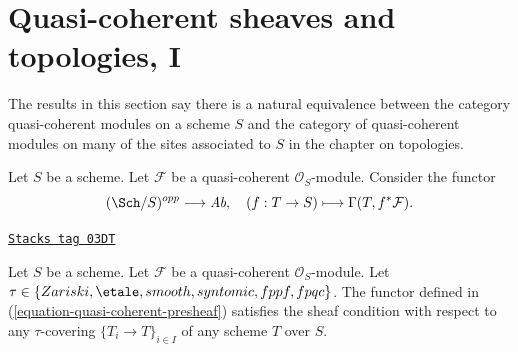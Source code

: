 \section{Quasi-coherent sheaves and topologies, I}
\label{descent-section-quasi-coherent-sheaves}
The results in this section say there is a natural equivalence between
the category quasi-coherent modules on a scheme $S$ and the category
of quasi-coherent modules on many of the sites associated to $S$
in the chapter on topologies.

\medskip\noindent
Let $S$ be a scheme.
Let $\mathcal{F}$ be a quasi-coherent $\mathcal{O}_S$-module.
Consider the functor
\begin{equation}
\label{equation-quasi-coherent-presheaf}
(\Sch/S)^{opp} \longrightarrow \textit{Ab},
\quad
(f : T \to S) \longmapsto \Gamma(T, f^*\mathcal{F}).
\end{equation}

\begin{lemma}
\label{descent-lemma-sheaf-condition-holds}
\href{https://stacks.math.columbia.edu/tag/03DT}{\texttt{Stacks tag 03DT}}

Let $S$ be a scheme.
Let $\mathcal{F}$ be a quasi-coherent $\mathcal{O}_S$-module.
Let $\tau \in \{Zariski, \linebreak[0] \etale, \linebreak[0] smooth,
\linebreak[0] syntomic, \linebreak[0] fppf, \linebreak[0] fpqc\}$.
The functor defined in (\ref{equation-quasi-coherent-presheaf})
satisfies the sheaf condition with respect to any $\tau$-covering
$\{T_i \to T\}_{i \in I}$ of any scheme $T$ over $S$.
\end{lemma}

